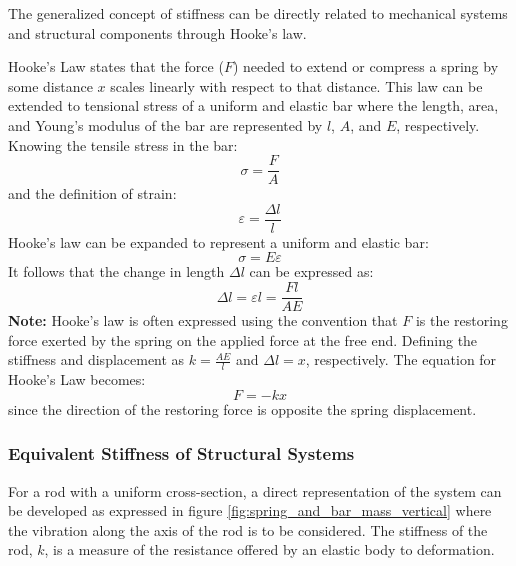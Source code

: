 \documentclass[12pt,letter]{article}
\begin{document}
		The generalized concept of stiffness can be directly related to mechanical systems and structural components through Hooke's law. 
		\begin{review}
			Hooke's Law states that the force ($F$) needed to extend or compress a spring by some distance $x$ scales linearly with respect to that distance. This law can be extended to tensional stress of a uniform and elastic bar where the length, area, and Young's modulus of the bar are represented by $l$, $A$, and $E$, respectively. Knowing the tensile stress in the bar:
			\begin{equation}
			\sigma = \frac{F}{A}
			\end{equation} 			
			and the definition of strain:
			\begin{equation}
			\varepsilon = \frac{\Delta l}{l}
			\end{equation} 			
			Hooke's law can be expanded to represent a uniform and elastic bar:
			\begin{equation}
			\sigma = E \varepsilon
			\end{equation} 			
			It follows that the change in length $\Delta l$ can be expressed as:		
			\begin{equation}
			\Delta l = \varepsilon l = \frac{F l}{A E}
			\end{equation} 
			\textbf{Note:} Hooke's law is often expressed using the convention that $F$ is the restoring force exerted by the spring on the applied force at the free end. Defining the stiffness and displacement as $k = \frac{AE}{l}$ and $\Delta l = x$, respectively. The equation for Hooke's Law becomes:
			\begin{equation}
			F = -kx
			\end{equation} 			
			since the direction of the restoring force is opposite the spring displacement.
		\end{review}
	
		\subsubsection{Equivalent Stiffness of Structural Systems}	
		
            For a rod with a uniform cross-section, a direct representation of the system can be developed as expressed in figure \ref{fig:spring_and_bar_mass_vertical} where the vibration along the axis of the rod is to be considered. The stiffness of the rod, $k$, is a measure of the resistance offered by an elastic body to deformation. 
\end{document}
